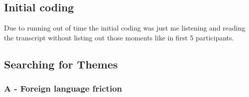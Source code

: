  
    

\subsection{Initial coding}

Due to running out of time the initial coding was just me listening and reading the transcript without listing out those moments like in first 5 participants. 
         


\subsection{Searching for Themes}

\subsubsection{A - Foreign language friction}

